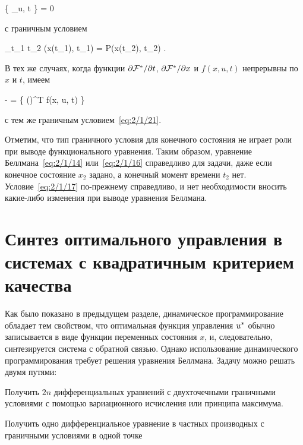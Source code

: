      \Biggl\{ _{u, t} \Biggr\} = 0
\eeq

с граничным условием

    \lim_{t_1 \to t_2} \optF\bigl(x(t_1), t_1\bigr) = P\bigl(x(t_2), t_2\bigr) \mbox{.}
\eeq

В тех же случаях, когда функции $\partial {    \mathcal{F}  ^{*}  } / \partial {t}$, $\partial {    \mathcal{F}  ^{*}  } / \partial {x}$ и $f(x, u, t)$ непрерывны по $x$ и $t$, имеем

    -  =  \Biggl\{ \biggl(\biggr)^T f(x, u, t) \Biggr\}
\eeq

с тем же граничным условием~\ref{eq:2/1/21}.

\br

Отметим, что тип граничного условия для конечного состояния не играет роли при выводе функционального уравнения. Таким образом, уравнение Беллмана~\ref{eq:2/1/14} или~\vref{eq:2/1/16} справедливо для задачи, даже если конечное состояние $x_2$ задано, а конечный момент времени $t_2$ нет. Условие~\vref{eq:2/1/17} по-прежнему справедливо, и нет необходимости вносить какие-либо изменения при выводе уравнения Беллмана.



\section{Синтез оптимального управления в системах с квадратичным критерием качества}



Как было показано в предыдущем разделе, динамическое программирование обладает тем свойством, что оптимальная функция управления $u^{*}$ обычно записывается в виде функции переменных состояния $x$, и, следовательно, синтезируется система с обратной связью. Однако использование динамического программирования требует решения уравнения Беллмана. Задачу можно решать двумя путями:

\benum
    \item
        Получить $2n$ дифференциальных уравнений с двухточечными граничными условиями с помощью вариационного исчисления или принципа максимума.
        
    \item
        Получить одно дифференциальное уравнение в частных производных с граничными условиями в одной точке
\eenum

